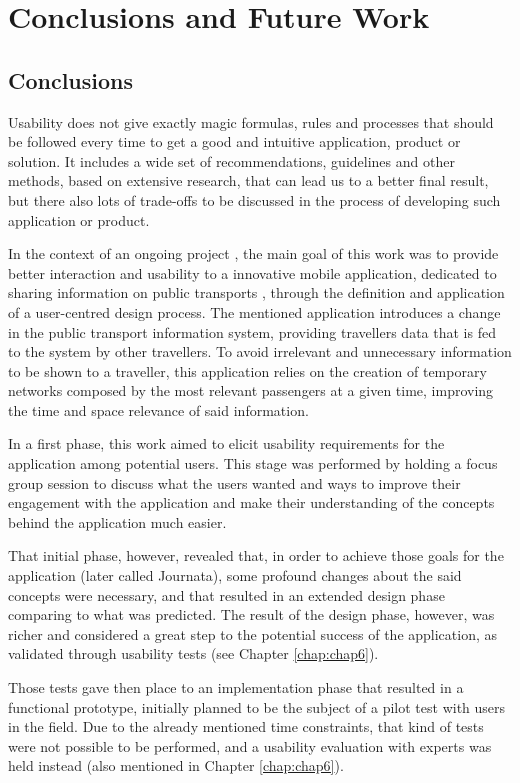 \chapter{Conclusions and Future Work} \label{chap:chap7}

\section{Conclusions}

Usability does not give exactly magic formulas, rules and processes that should be followed every time to get a good and intuitive application, product or solution.
It includes a wide set of recommendations, guidelines and other methods, based on extensive research, that can lead us to a better final result, but there also lots of trade-offs to be discussed in the process of developing such application or product.

In the context of an ongoing project \cite{kn:NGeCP11}, the main goal of this work was to provide better interaction and usability to a innovative mobile application, dedicated to sharing information on public transports \cite{kn:eSG12}, through the definition and application of a user-centred design process. The mentioned application introduces a change in the public transport information system, providing travellers data that is fed to the system by other travellers. To avoid irrelevant and unnecessary information to be shown to a traveller, this application relies on the creation of temporary networks composed by the most relevant passengers at a given time, improving the time and space relevance of said information.

In a first phase, this work aimed to elicit usability requirements for the application among potential users. This stage was performed by holding a focus group session to discuss what the users wanted and ways to improve their engagement with the application and make their understanding of the concepts behind the application much easier.

That initial phase, however, revealed that, in order to achieve those goals for the application (later called Journata), some profound changes about the said concepts were necessary, and that resulted in an extended design phase comparing to what was predicted. 
The result of the design phase, however, was richer and considered a great step to the potential success of the application, as validated through usability tests (see Chapter \ref{chap:chap6}).

Those tests gave then place to an implementation phase that resulted in a functional prototype, initially planned to be the subject of a pilot test with users in the field. Due to the already mentioned time constraints, that kind of tests were not possible to be performed, and a usability evaluation with experts was held instead (also mentioned in Chapter \ref{chap:chap6}). 

